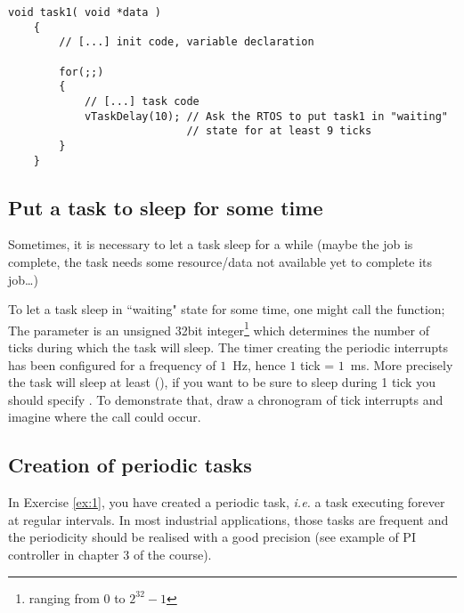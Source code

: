     \begin{lstlisting}[caption={Basic task example}, label={lst:listing 2}]
    void task1( void *data )
    {
        // [...] init code, variable declaration
        
        for(;;)
        {
            // [...] task code
            vTaskDelay(10); // Ask the RTOS to put task1 in "waiting"
                            // state for at least 9 ticks
        }
    }
    \end{lstlisting}

\newpage
\subsection{Put a task to sleep for some time}
    Sometimes, it is necessary to let a task sleep for a while (maybe the job is complete, the task needs some resource/data not available yet to complete its job\dots)%

    To let a task sleep in ``waiting" state for some time, one might call the  function; The parameter  is an unsigned 32bit integer\footnote{ranging from 0 to $ 2^{32} - 1 $} which determines the number of ticks during which the task will sleep. The timer creating the periodic interrupts has been configured for a frequency of $ 1 $~Hz, hence $1$ tick = $ 1 $~ms. More precisely the task will sleep at least (), if you want to be sure to sleep during 1 tick you should specify . To demonstrate that, draw a chronogram of tick interrupts and imagine where the call  could occur.


\subsection{Creation of periodic tasks}
    In Exercise \ref{ex:1}, you have created a periodic task, \textit{i.e.} a task executing forever at regular intervals. In most industrial applications, those tasks are frequent and the periodicity should be realised with a good precision (see example of PI controller in chapter 3 of the course).

